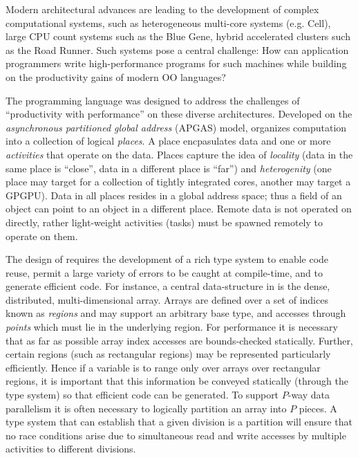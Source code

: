 
Modern architectural advances are leading to the development of
complex computational systems, such as heterogeneous multi-core
systems (e.g. Cell), large CPU count systems such as the Blue Gene,
hybrid accelerated clusters such as the Road Runner.  Such systems
pose a central challenge: How can application programmers write
high-performance programs for such machines while building on the
productivity gains of modern OO languages?

The \Xten{} programming language \cite{concur05,oopsla05,x10} was
designed to address the challenges of ``productivity with
performance'' on these diverse architectures. Developed on
the {\em asynchronous partitioned global address} (APGAS) model, 
\Xten{} organizes computation into a collection of
logical {\em places}. A place encpasulates data and one or more {\em
activities} that operate on the data. Places capture the idea of {\em
locality} (data in the same place is ``close'', data in a different
place is ``far'') and {\em heterogenity} (one place may target for a
collection of tightly integrated cores, another may target a
GPGPU). Data in all places resides in a global address space; thus a
field of an object can point to an object in a different place. Remote
data is not operated on directly, rather light-weight activities
(tasks) must be spawned remotely to operate on them.

The design of \Xten{} requires the development of a rich type system
to enable code reuse, permit a large variety of errors to be caught at
compile-time, and to generate efficient code. For instance, a central
data-structure in \Xten{} is the dense, distributed, multi-dimensional
array. Arrays are defined over a set of indices known as {\em regions}
and may support an arbitrary base type, and accesses through {\em
points} which must lie in the underlying region. For performance it is
necessary that as far as possible array index accesses are
bounds-checked statically. Further, certain regions (such as
rectangular regions) may be represented particularly
efficiently. Hence if a variable is to range only over arrays over
rectangular regions, it is important that this information be conveyed
statically (through the type system) so that efficient code can be
generated. To support $P$-way data parallelism it is often necessary
to logically partition an array into $P$ pieces. A type system that
can establish that a given division is a partition will ensure that no
race conditions arise due to simultaneous read and write accesses by
multiple activities to different divisions.

